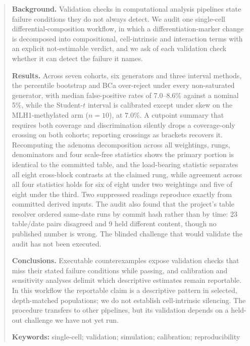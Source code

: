 \begin{abstract}
\noindent\textbf{Background.}
Validation checks in computational analysis pipelines state failure conditions
they do not always detect. We audit one single-cell differential-composition
workflow, in which a differentiation-marker change is decomposed into
compositional, cell-intrinsic and interaction terms with an explicit
not-estimable verdict, and we ask of each validation check whether it can detect
the failure it names.

\noindent\textbf{Results.}
Across seven cohorts, six generators and three interval methods, the percentile
bootstrap and BCa over-reject under every non-saturated generator, with median
false-positive rates of 7.0--8.6\% against a nominal 5\%, while the Student-$t$
interval is calibrated except under skew on the MLH1-methylated arm ($n=10$), at
7.0\%. A
cutpoint summary that requires both coverage and discrimination silently drops a
coverage-only crossing on both cohorts; reporting crossings as brackets recovers
it. Recomputing the adenoma decomposition across all weightings, rungs,
denominators and four scale-free statistics shows the primary portion is
identical to the committed table, and the load-bearing statistic separates all
eight cross-block contrasts at the claimed rung, while agreement across all four
statistics holds for six of eight under two weightings and five of eight under
the third. Two suppressed readings reproduce exactly from committed derived
inputs. The audit also found that the project's table resolver ordered same-date
runs by commit hash rather than by time: 23 table/date pairs disagreed and 9 held
different content, though no published number is wrong. The blinded challenge
that would validate the audit has not been executed.

\noindent\textbf{Conclusions.}
Executable counterexamples expose validation checks that miss their stated
failure conditions while passing, and calibration and sensitivity analyses
delimit which descriptive estimates remain reportable. In this workflow the
reportable claim is a descriptive pattern in selected, depth-matched populations;
we do not establish cell-intrinsic silencing. The procedure transfers to other
pipelines, but its validation depends on a held-out challenge we have not yet
run.

\noindent\textbf{Keywords:}
single-cell; validation; simulation; calibration; reproducibility
\end{abstract}
